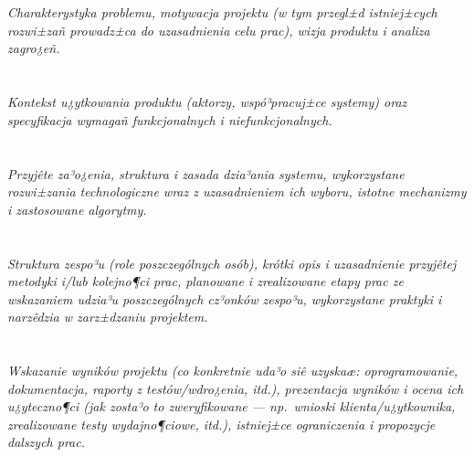 \documentclass[polish,12pt]{aghthesis}
\author{Antoni Mleczko \\ Maciej Mionskowski}
\date{\the\year}
\begin{document}
\maketitle

\section{\SectionTitleProjectVision}
\label{sec:cel-wizja}
\emph{Charakterystyka problemu, motywacja projektu (w tym przegl±d
  istniej±cych rozwi±zañ prowadz±ca do uzasadnienia celu prac),
  wizja produktu i analiza zagro¿eñ.}  

\section{\SectionTitleScope}
\label{sec:zakres-funkcjonalnosci}
\emph{Kontekst u¿ytkowania produktu (aktorzy, wspó³pracuj±ce systemy)
  oraz specyfikacja wymagañ funkcjonalnych i niefunkcjonalnych.}  

\section{\SectionTitleRealizationAspects}
\label{sec:wybrane-aspekty-realizacji}
\emph{Przyjête za³o¿enia, struktura i zasada dzia³ania systemu,
  wykorzystane rozwi±zania technologiczne wraz z uzasadnieniem
  ich wyboru, istotne mechanizmy i zastosowane algorytmy.} 

\section{\SectionTitleWorkOrganization}
\label{sec:organizacja-pracy}
\emph{Struktura zespo³u (role poszczególnych osób), krótki opis i
  uzasadnienie przyjêtej metodyki i/lub kolejno¶ci prac, planowane i
  zrealizowane etapy prac ze wskazaniem udzia³u poszczególnych
  cz³onków zespo³u, wykorzystane praktyki i narzêdzia w zarz±dzaniu
  projektem.}  

\section{\SectionTitleResults}
\label{sec:wyniki-projektu}
\emph{Wskazanie wyników projektu (co konkretnie uda³o siê uzyskaæ:
  oprogramowanie, dokumentacja, raporty z testów/wdro¿enia, itd.), prezentacja wyników
  i ocena ich u¿yteczno¶ci (jak zosta³o to zweryfikowane --- np.\ wnioski
  klienta/u¿ytkownika, zrealizowane testy wydajno¶ciowe, itd.),
  istniej±ce ograniczenia i propozycje dalszych prac.} 


\nocite{artykul2011,ksiazka2011,narzedzie2011,projekt2011}


\end{document}
